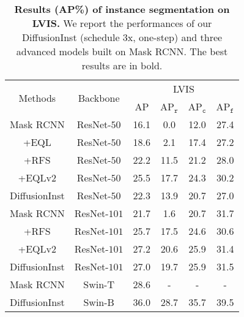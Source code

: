 \documentclass{article}
\begin{document}
\begin{table}[t]
\centering
 \begin{tabular}{c|c|c|ccc}
\toprule 
  \multirow{2}{*}{Methods}
  & \multirow{2}{*}{Backbone}
  & \multicolumn{4}{c}{LVIS} \\
& 
  & AP 
  & AP$_{\mathtt{r}}$ 
  & AP$_{\mathtt{c}}$ 
  & AP$_{\mathtt{f}}$  \\
\midrule
  Mask RCNN &  ResNet-$50$  &16.1  &0.0 & 12.0  & 27.4 \\
  +EQL &  ResNet-$50$  &18.6   & 2.1& 17.4 &27.2      \\
  +RFS &  ResNet-$50$  &22.2 &11.5& 21.2& 28.0 \\
  +EQLv2 &  ResNet-$50$  &25.5 &17.7& 24.3 &30.2 \\
  DiffusionInst &  ResNet-$50$  & 22.3 &13.9&20.7&27.0  \\ \midrule
  Mask RCNN &  ResNet-$101$  & 21.7& 1.6& 20.7& 31.7 \\
  +RFS &  ResNet-$101$  &25.7& 17.5& 24.6& 30.6   \\
  +EQLv2 &  ResNet-$101$  &27.2 &20.6& {25.9}& 31.4  \\
  DiffusionInst &  ResNet-$101$  & 27.0 & 19.7 & 25.9 &31.5    \\ \midrule
  Mask RCNN & Swin-T& 28.6&-&-&- \\
  DiffusionInst &  Swin-B  &{36.0}  & {28.7} & {35.7} & {39.5}  \\ \bottomrule
\end{tabular}
\caption{\textbf{Results (AP\%) of instance segmentation on LVIS.} We report the performances of our DiffusionInst (schedule 3x, one-step) and three advanced models built on Mask RCNN. The best results are in bold.}
\label{sota_lvis}
\end{table}
\end{document}
